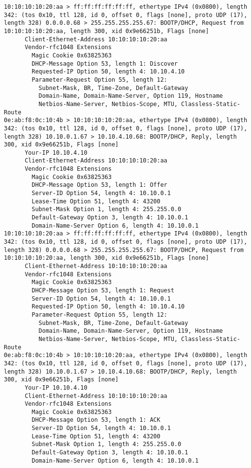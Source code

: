 \documentclass[a4paper,12pt]{article}
\begin{document}
\begin{Verbatim}
10:10:10:10:20:aa > ff:ff:ff:ff:ff:ff, ethertype IPv4 (0x0800), length 342: (tos 0x10, ttl 128, id 0, offset 0, flags [none], proto UDP (17), length 328) 0.0.0.0.68 > 255.255.255.255.67: BOOTP/DHCP, Request from 10:10:10:10:20:aa, length 300, xid 0x9e66251b, Flags [none]
	  Client-Ethernet-Address 10:10:10:10:20:aa
	  Vendor-rfc1048 Extensions
	    Magic Cookie 0x63825363
	    DHCP-Message Option 53, length 1: Discover
	    Requested-IP Option 50, length 4: 10.10.4.10
	    Parameter-Request Option 55, length 12: 
	      Subnet-Mask, BR, Time-Zone, Default-Gateway
	      Domain-Name, Domain-Name-Server, Option 119, Hostname
	      Netbios-Name-Server, Netbios-Scope, MTU, Classless-Static-Route
0e:ab:f8:0c:10:4b > 10:10:10:10:20:aa, ethertype IPv4 (0x0800), length 342: (tos 0x10, ttl 128, id 0, offset 0, flags [none], proto UDP (17), length 328) 10.10.0.1.67 > 10.10.4.10.68: BOOTP/DHCP, Reply, length 300, xid 0x9e66251b, Flags [none]
	  Your-IP 10.10.4.10
	  Client-Ethernet-Address 10:10:10:10:20:aa
	  Vendor-rfc1048 Extensions
	    Magic Cookie 0x63825363
	    DHCP-Message Option 53, length 1: Offer
	    Server-ID Option 54, length 4: 10.10.0.1
	    Lease-Time Option 51, length 4: 43200
	    Subnet-Mask Option 1, length 4: 255.255.0.0
	    Default-Gateway Option 3, length 4: 10.10.0.1
	    Domain-Name-Server Option 6, length 4: 10.10.0.1
10:10:10:10:20:aa > ff:ff:ff:ff:ff:ff, ethertype IPv4 (0x0800), length 342: (tos 0x10, ttl 128, id 0, offset 0, flags [none], proto UDP (17), length 328) 0.0.0.0.68 > 255.255.255.255.67: BOOTP/DHCP, Request from 10:10:10:10:20:aa, length 300, xid 0x9e66251b, Flags [none]
	  Client-Ethernet-Address 10:10:10:10:20:aa
	  Vendor-rfc1048 Extensions
	    Magic Cookie 0x63825363
	    DHCP-Message Option 53, length 1: Request
	    Server-ID Option 54, length 4: 10.10.0.1
	    Requested-IP Option 50, length 4: 10.10.4.10
	    Parameter-Request Option 55, length 12: 
	      Subnet-Mask, BR, Time-Zone, Default-Gateway
	      Domain-Name, Domain-Name-Server, Option 119, Hostname
	      Netbios-Name-Server, Netbios-Scope, MTU, Classless-Static-Route
0e:ab:f8:0c:10:4b > 10:10:10:10:20:aa, ethertype IPv4 (0x0800), length 342: (tos 0x10, ttl 128, id 0, offset 0, flags [none], proto UDP (17), length 328) 10.10.0.1.67 > 10.10.4.10.68: BOOTP/DHCP, Reply, length 300, xid 0x9e66251b, Flags [none]
	  Your-IP 10.10.4.10
	  Client-Ethernet-Address 10:10:10:10:20:aa
	  Vendor-rfc1048 Extensions
	    Magic Cookie 0x63825363
	    DHCP-Message Option 53, length 1: ACK
	    Server-ID Option 54, length 4: 10.10.0.1
	    Lease-Time Option 51, length 4: 43200
	    Subnet-Mask Option 1, length 4: 255.255.0.0
	    Default-Gateway Option 3, length 4: 10.10.0.1
	    Domain-Name-Server Option 6, length 4: 10.10.0.1
\end{Verbatim}
\end{document}
